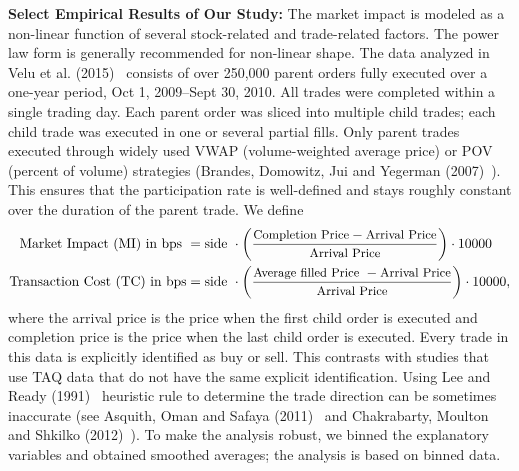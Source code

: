 \noindent\textbf{Select Empirical Results of Our Study:} The market impact is modeled as a non-linear function of several stock-related and trade-related factors. The power law form is generally recommended for non-linear shape. The data analyzed in Velu et al. (2015)~\cite{unpub} consists of over 250,000 parent orders fully executed over a one-year period, Oct 1, 2009--Sept 30, 2010. All trades were completed within a single trading day. Each parent order was sliced into multiple child trades; each child trade was executed in one or several partial fills. Only parent trades executed through widely used VWAP (volume-weighted average price) or POV (percent of volume) strategies (Brandes, Domowitz, Jui and Yegerman (2007)~\cite{brandes2007}). This ensures that the participation rate is well-defined and stays roughly constant over the duration of the parent trade. We define 
	\[
	\begin{aligned}
	\text{Market Impact (MI) in bps }&= \text{side } \cdot \left(\dfrac{\text{{\small Completion Price}} - \text{{\small Arrival Price}}}{\text{{\small Arrival Price}}}\right) \cdot 10000 \\
	\text{Transaction Cost (TC) in bps}&= \text{side } \cdot \left(\dfrac{\text{{\small Average filled Price }}-\text{{\small Arrival Price}}}{\text{{\small Arrival Price}}} \right) \cdot 10000,
	\end{aligned} 
	\] \normalsize
where the arrival price is the price when the first child order is executed and completion price is the price when the last child order is executed. Every trade in this data is explicitly identified as buy or sell. This contrasts with studies that use TAQ data that do not have the same explicit identification. Using Lee and Ready (1991)~\cite{leeready} heuristic rule to determine the trade direction can be sometimes inaccurate (see Asquith, Oman and Safaya (2011)~\cite{asquith2010} and Chakrabarty, Moulton and Shkilko (2012)~\cite{chakrabarty2012short}). To make the analysis robust, we binned the explanatory variables and obtained smoothed averages; the analysis is based on binned data.


